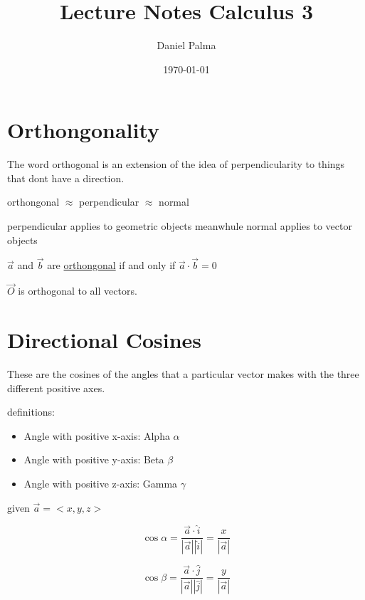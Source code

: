 \documentclass{article}
\author{Daniel Palma}
\date{\today}
\title{Lecture Notes Calculus 3}
\begin{document}
\maketitle
\newpage

\tableofcontents
\newpage

\section{Orthongonality}

The word orthogonal is an extension of the idea of perpendicularity to things that dont have a direction.


\begin{center}
    orthongonal $\approx$ perpendicular $\approx$ normal 
\end{center}
perpendicular applies to geometric objects meanwhule normal applies to vector objects

\begin{center}
    $\vec{a}$ and $\vec{b}$ are \underline{orthongonal} if and only if $\vec{a} \cdot \vec{b} = 0$

    \bigskip

    $\vec{O}$ is orthogonal to all vectors.
\end{center}

\newpage
\section{Directional Cosines}

These are the cosines of the angles that a particular vector makes with the three different positive axes.

\bigskip

definitions:
\begin{itemize}
    \item Angle with positive x-axis: Alpha $\alpha$
    \item Angle with positive y-axis: Beta $\beta$
    \item Angle with positive z-axis: Gamma $\gamma$
\end{itemize}

\begin{center}
    given $\vec{a} = <x,y,z>$
\end{center}

$$\cos\alpha = \frac{\vec{a} \cdot \hat{i}}{|\vec{a}| |\hat{i}|} = \frac{x}{|\vec{a}|}$$

$$\cos\beta = \frac{\vec{a} \cdot \hat{j}}{|\vec{a}| |\hat{j}|} = \frac{y}{|\vec{a}|}$$
\end{document}
